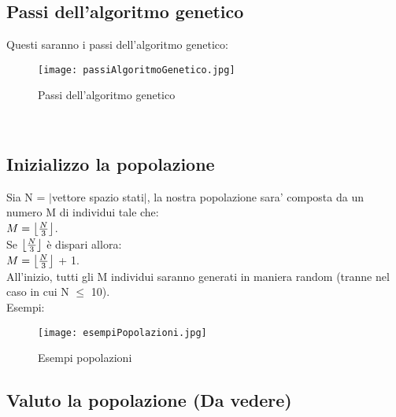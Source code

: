 \documentclass[10pt,a4paper]{article}
\begin{document}
      \newpage
      
    \subsection{Passi dell'algoritmo genetico}
      \label{passiDellAlgoritmoGeneticoSubsection}
      Questi saranno i passi dell'algoritmo genetico:
      \begin{figure}[h!]
        \centering
        \caption{Passi dell'algoritmo genetico}
        \texttt{[image: passiAlgoritmoGenetico.jpg]}
        \label{passiAlgoritmoGenetico}
      \end{figure}\\
            
    \subsection{Inizializzo la popolazione}
      \label{inizializzoLaPopolazioneSubsection}
      Sia N = $\lvert$vettore spazio stati$\rvert$, la nostra popolazione sara' composta da un numero M di individui tale che:\\ 
      $ M = \bigl\lfloor {N \over 3} \bigl\rfloor $.\\
      Se $\bigl\lfloor {N \over 3} \bigl\rfloor $ è dispari allora:\\ 
      $ M = \bigl\lfloor {N \over 3} \bigl\rfloor $ + 1.\\
      All'inizio, tutti gli M individui saranno generati in maniera random (tranne nel caso in cui N $\leq$ 10).\\
      Esempi:
      \begin{figure}
        \centering
        \caption{Esempi popolazioni}
        \texttt{[image: esempiPopolazioni.jpg]}
        \label{esempiPopolazioni}
      \end{figure}
      
      \newpage
      
    \subsection{Valuto la popolazione (Da vedere)}
      \label{valutoLaPopolazioneSubsection}
      
\end{document}
